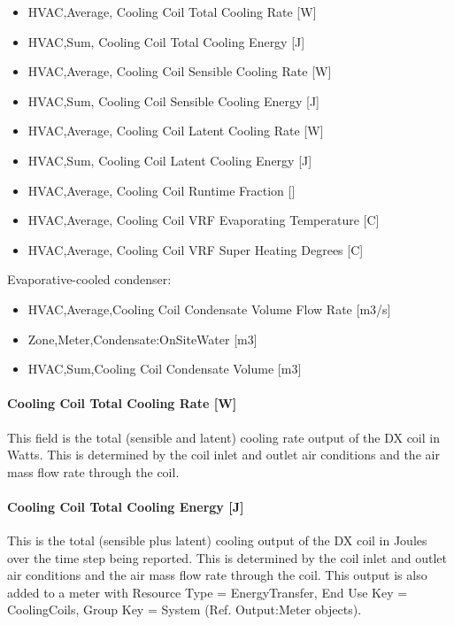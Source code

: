 \begin{itemize}
\item
  HVAC,Average, Cooling Coil Total Cooling Rate {[}W{]}
\item
  HVAC,Sum, Cooling Coil Total Cooling Energy {[}J{]}
\item
  HVAC,Average, Cooling Coil Sensible Cooling Rate {[}W{]}
\item
  HVAC,Sum, Cooling Coil Sensible Cooling Energy {[}J{]}
\item
  HVAC,Average, Cooling Coil Latent Cooling Rate {[}W{]}
\item
  HVAC,Sum, Cooling Coil Latent Cooling Energy {[}J{]}
\item
  HVAC,Average, Cooling Coil Runtime Fraction {[]}
\item
  HVAC,Average, Cooling Coil VRF Evaporating Temperature {[}C{]}
\item
  HVAC,Average, Cooling Coil VRF Super Heating Degrees {[}C{]}
\end{itemize}

Evaporative-cooled condenser:

\begin{itemize}
\item
  HVAC,Average,Cooling Coil Condensate Volume Flow Rate {[}m3/s{]}
\item
  Zone,Meter,Condensate:OnSiteWater {[}m3{]}
\item
  HVAC,Sum,Cooling Coil Condensate Volume {[}m3{]}
\end{itemize}

\paragraph{Cooling Coil Total Cooling Rate {[}W{]}}\label{cooling-coil-total-cooling-rate-w-2}

This field is the total (sensible and latent) cooling rate output of the DX coil in Watts. This is determined by the coil inlet and outlet air conditions and the air mass flow rate through the coil.

\paragraph{Cooling Coil Total Cooling Energy {[}J{]}}\label{cooling-coil-total-cooling-energy-j-2}

This is the total (sensible plus latent) cooling output of the DX coil in Joules over the time step being reported. This is determined by the coil inlet and outlet air conditions and the air mass flow rate through the coil. This output is also added to a meter with Resource Type = EnergyTransfer, End Use Key = CoolingCoils, Group Key = System (Ref. Output:Meter objects).

